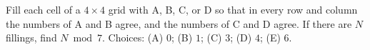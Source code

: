 Fill each cell of a $4\times4$ grid with A, B, C, or D so that in every row and column the numbers of A and B agree, and the numbers of C and D agree. If there are $N$ fillings, find $N\bmod7$. Choices: (A) $0$; (B) $1$; (C) $3$; (D) $4$; (E) $6$.
